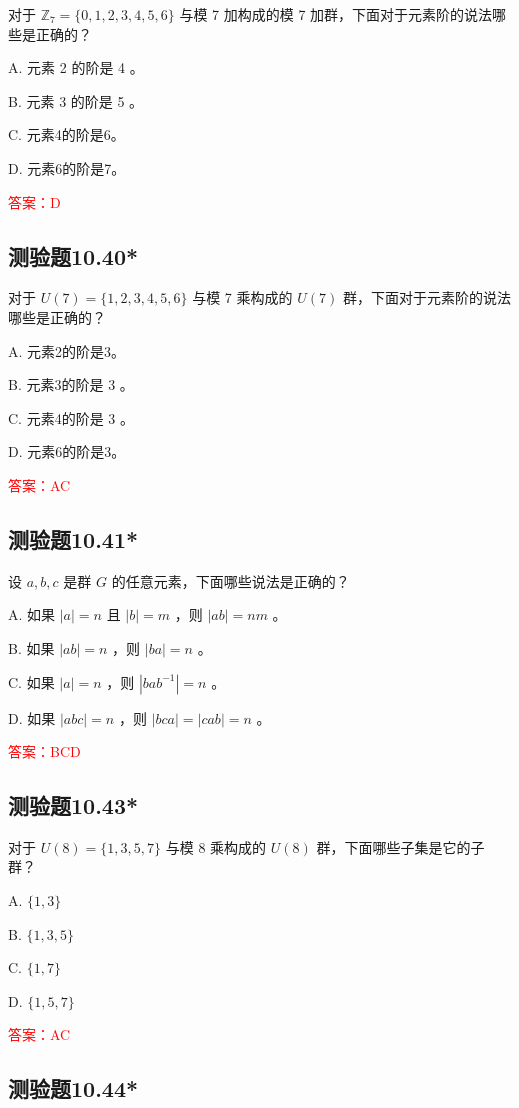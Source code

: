 \documentclass[UTF8, heading=true]{ctexart}
\begin{document}
对于 $\mathbb{Z}_7=\{0,1,2,3,4,5,6\}$ 与模 7 加构成的模 7 加群，下面对于元素阶的说法哪些是正确的？

A. 元素 2 的阶是 4 。

B. 元素 3 的阶是 5 。

C. 元素4的阶是6。

D. 元素6的阶是7。

\textcolor{red}{答案：D}


\subsection{测验题10.40*}

对于 $U(7)=\{1,2,3,4,5,6\}$ 与模 7 乘构成的 $U(7)$ 群，下面对于元素阶的说法哪些是正确的？

A. 元素2的阶是3。

B. 元素3的阶是 3 。

C. 元素4的阶是 3 。

D. 元素6的阶是3。

\textcolor{red}{答案：AC}

\subsection{测验题10.41*}

设 $a, b, c$ 是群 $G$ 的任意元素，下面哪些说法是正确的？

A. 如果 $|a|=n$ 且 $|b|=m$ ，则 $|a b|=n m$ 。

B. 如果 $|a b|=n$ ，则 $|b a|=n$ 。

C. 如果 $|a|=n$ ，则 $\left|b a b^{-1}\right|=n$ 。

D. 如果 $|a b c|=n$ ，则 $|b c a|=|c a b|=n$ 。


\textcolor{red}{答案：BCD}

\subsection{测验题10.43*}

对于 $U(8)=\{1,3,5,7\}$ 与模 8 乘构成的 $U(8)$ 群，下面哪些子集是它的子群？

A. $\{1,3\}$

B. $\{1,3,5\}$

C. $\{1,7\}$

D. $\{1,5,7\}$

\textcolor{red}{答案：AC}

\subsection{测验题10.44*}
\end{document}
